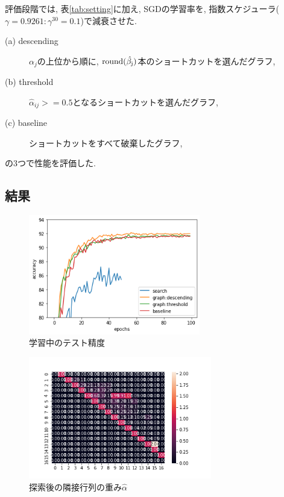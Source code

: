 \documentclass[twocolumn]{jarticle}     %
\begin{document}
評価段階では, 表\ref{tab:setting}に加え, SGDの学習率を, 指数スケジューラ($\gamma = 0.9261 : \gamma^{30} = 0.1$)で減衰させた.

\begin{description}
  \item[(a) descending] $\alpha_j$の上位から順に, $\rm{round}(\hat{\beta_j})$本のショートカットを選んだグラフ,
  \item[(b) threshold] $\hat{\alpha}_{ij} >= 0.5$となるショートカットを選んだグラフ,
  \item[(c) baseline] ショートカットをすべて破棄したグラフ,
\end{description}
の3つで性能を評価した.

\subsection{結果}

\begin{figure}[tb]
	\begin{center}
		\includegraphics[clip,width=75mm]{acc.png}
		\caption{学習中のテスト精度}
		\label{fig:acc}
	\end{center}
\end{figure}

\begin{figure}[tb]
	\begin{center}
		\includegraphics[clip,width=80mm]{alpha_50.png}
		\caption{探索後の隣接行列の重み$\hat{\alpha}$}
		\label{fig:alpha}
	\end{center}
\end{figure}
\end{document}
